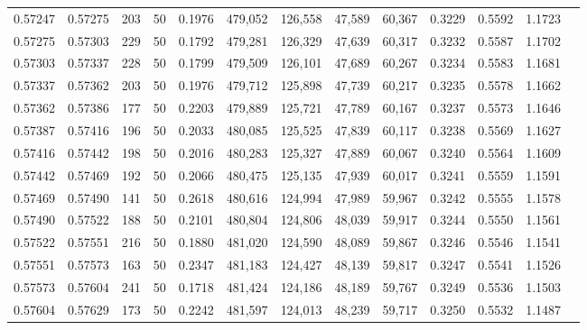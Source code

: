 \begin{tabular}{rrrrrrrrrrrrr}
0.57247 & 0.57275 &   203 &  50 &                                     0.1976 & 479,052 & 126,558 &  47,589 &  60,367 & 0.3229 & 0.5592 & 1.1723 \\
0.57275 & 0.57303 &   229 &  50 &                                     0.1792 & 479,281 & 126,329 &  47,639 &  60,317 & 0.3232 & 0.5587 & 1.1702 \\
0.57303 & 0.57337 &   228 &  50 &                                     0.1799 & 479,509 & 126,101 &  47,689 &  60,267 & 0.3234 & 0.5583 & 1.1681 \\
0.57337 & 0.57362 &   203 &  50 &                                     0.1976 & 479,712 & 125,898 &  47,739 &  60,217 & 0.3235 & 0.5578 & 1.1662 \\
0.57362 & 0.57386 &   177 &  50 &                                     0.2203 & 479,889 & 125,721 &  47,789 &  60,167 & 0.3237 & 0.5573 & 1.1646 \\
0.57387 & 0.57416 &   196 &  50 &                                     0.2033 & 480,085 & 125,525 &  47,839 &  60,117 & 0.3238 & 0.5569 & 1.1627 \\
0.57416 & 0.57442 &   198 &  50 &                                     0.2016 & 480,283 & 125,327 &  47,889 &  60,067 & 0.3240 & 0.5564 & 1.1609 \\
0.57442 & 0.57469 &   192 &  50 &                                     0.2066 & 480,475 & 125,135 &  47,939 &  60,017 & 0.3241 & 0.5559 & 1.1591 \\
0.57469 & 0.57490 &   141 &  50 &                                     0.2618 & 480,616 & 124,994 &  47,989 &  59,967 & 0.3242 & 0.5555 & 1.1578 \\
0.57490 & 0.57522 &   188 &  50 &                                     0.2101 & 480,804 & 124,806 &  48,039 &  59,917 & 0.3244 & 0.5550 & 1.1561 \\
0.57522 & 0.57551 &   216 &  50 &                                     0.1880 & 481,020 & 124,590 &  48,089 &  59,867 & 0.3246 & 0.5546 & 1.1541 \\
0.57551 & 0.57573 &   163 &  50 &                                     0.2347 & 481,183 & 124,427 &  48,139 &  59,817 & 0.3247 & 0.5541 & 1.1526 \\
0.57573 & 0.57604 &   241 &  50 &                                     0.1718 & 481,424 & 124,186 &  48,189 &  59,767 & 0.3249 & 0.5536 & 1.1503 \\
0.57604 & 0.57629 &   173 &  50 &                                     0.2242 & 481,597 & 124,013 &  48,239 &  59,717 & 0.3250 & 0.5532 & 1.1487 \\

\end{tabular}

